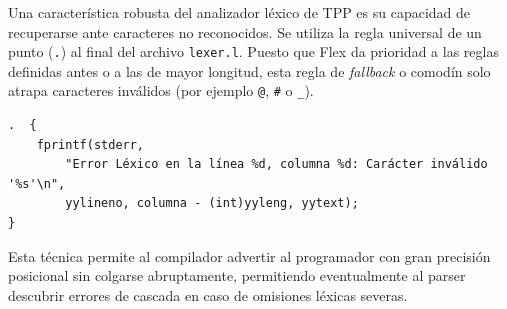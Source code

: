 Una característica robusta del analizador léxico de TPP es su capacidad de recuperarse ante caracteres no reconocidos. Se utiliza la regla universal de un punto (\texttt{.}) al final del archivo \texttt{lexer.l}. Puesto que Flex da prioridad a las reglas definidas antes o a las de mayor longitud, esta regla de \textit{fallback} o comodín solo atrapa caracteres inválidos (por ejemplo \texttt{@}, \texttt{\#} o \texttt{\_}).

\begin{lstlisting}[style=cstyle, caption={Regla general de manejo de errores léxicos}]
.  { 
    fprintf(stderr, 
        "Error Léxico en la línea %d, columna %d: Carácter inválido '%s'\n", 
        yylineno, columna - (int)yyleng, yytext);
}
\end{lstlisting}

Esta técnica permite al compilador advertir al programador con gran precisión posicional sin colgarse abruptamente, permitiendo eventualmente al parser descubrir errores de cascada en caso de omisiones léxicas severas.
